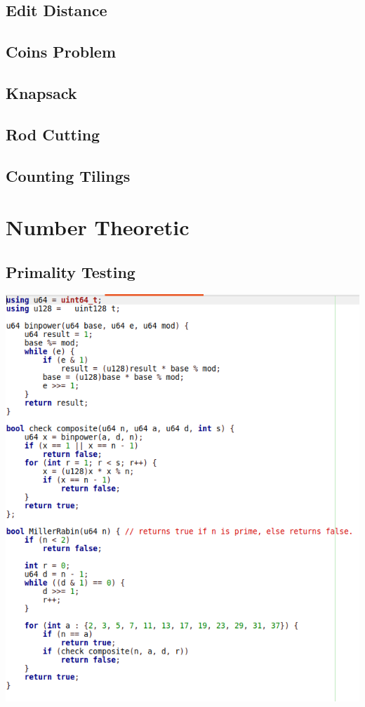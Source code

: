 \documentclass[11pt,twocolumn]{article}
\begin{document}
\subsection{Edit Distance}
\subsection{Coins Problem}
\subsection{Knapsack}
\subsection{Rod Cutting}
\subsection{Counting Tilings}

\section{Number Theoretic}
\subsection{Primality Testing}

\includegraphics[scale=0.5]{millerrabin}
\end{document}
